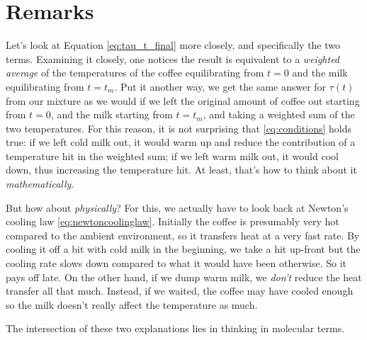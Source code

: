 \documentclass[11pt]{article}
\begin{document}
\section{Remarks}

Let's look at Equation \eqref{eq:tau_t_final} more closely, and specifically the two terms. Examining it closely, one notices the result is equivalent to a \textit{weighted average} of the temperatures of the coffee equilibrating from $t=0$ and the milk equilibrating from $t=t_{m}$. Put it another way, we get the same answer for $\tau(t)$ from our mixture as we would if we left the original amount of coffee out starting from $t=0$, and the milk starting from $t=t_{m}$, and taking a weighted sum of the two temperatures. For this reason, it is not surprising that \eqref{eq:conditions} holds true: if we left cold milk out, it would warm up and reduce the contribution of a temperature hit in the weighted sum; if we left warm milk out, it would cool down, thus increasing the temperature hit. At least, that's how to think about it \textit{mathematically}.

\vspace{10pt}
But how about \textit{physically}? For this, we actually have to look back at Newton's cooling law \eqref{eq:newtoncoolinglaw}. Initially the coffee is presumably very hot compared to the ambient environment, so it transfers heat at a very fast rate. By cooling it off a bit with cold milk in the beginning, we take a hit up-front but the cooling rate slows down compared to what it would have been otherwise. So it pays off late. On the other hand, if we dump warm milk, we \textit{don't} reduce the heat transfer all that much. Instead, if we waited, the coffee may have cooled enough so the milk doesn't really affect the temperature as much. 

\vspace{10pt}
The intersection of these two explanations lies in thinking in molecular terms. 
\end{document}
